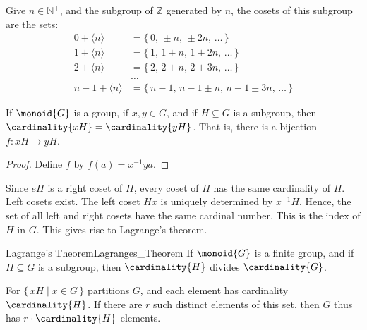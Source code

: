 \documentclass{book}                                                           %
\begin{document}
            \begin{example}
                Give $n\in\mathbb{N}^{+}$, and the subgroup of $\mathbb{Z}$
                generated by $n$, the cosets of this subgroup are the
                sets:
                \begin{subequations}
                    \begin{align}
                        0+\langle{n}\rangle
                            &=\{\,0,\,\pm{n},\,\pm{2}n,\,\dots\,\}\\
                        1+\langle{n}\rangle
                            &=\{\,1,\,1\pm{n},\,1\pm{2}n,\,\dots\,\}\\
                        2+\langle{n}\rangle
                            &=\{\,2,\,2\pm{n},\,2\pm{3}n,\,\dots\,\}\\
                        &\hdots\\
                        n-1+\langle{n}\rangle
                        &=\{\,n-1,\,n-1\pm{n},\,n-1\pm{3}n,\,\dots\,\}
                    \end{align}
                \end{subequations}
            \end{example}
            \begin{theorem}
                If $\monoid{G}$ is a group, if $x,y\in{G}$, and if
                $H\subseteq{G}$ is a subgroup, then
                $\cardinality{xH}=\cardinality{yH}$. That is, there is a
                bijection $f:xH\rightarrow{y}H$.
            \end{theorem}
            \begin{proof}
                Define $f$ by $f(a)=x^{\minus{1}}ya$.
            \end{proof}
            Since $eH$ is a right coset of $H$, every coset of $H$ has the
            same cardinality of $H$. Left cosets exist. The left coset
            $Hx$ is uniquely determined by $x^{\minus{1}}H$. Hence, the set
            of all left and right cosets have the same cardinal number. This
            is the index of $H$ in $G$. This gives rise to Lagrange's
            theorem.
            \begin{ftheorem}{Lagrange's Theorem}{Lagranges_Theorem}
                If $\monoid{G}$ is a finite group, and if $H\subseteq{G}$
                is a subgroup, then $\cardinality{H}$ divides
                $\cardinality{G}$.
            \end{ftheorem}
            \begin{bproof}
                For $\{\,xH\;|\;x\in{G}\,\}$ partitions $G$, and each
                element has cardinality $\cardinality{H}$. If there are $r$
                such distinct elements of this set, then $G$ thus has
                $r\cdot\cardinality{H}$ elements.
            \end{bproof}
\end{document}
